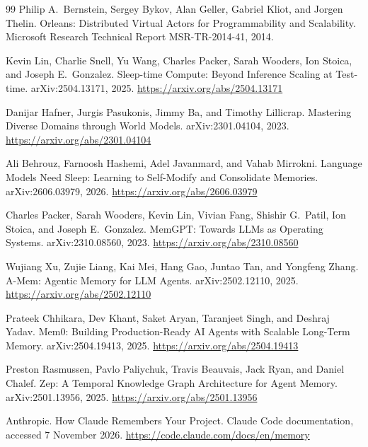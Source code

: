 \documentclass[11pt,a4paper]{article}
\theoremstyle{definition}
\begin{document}
\begin{thebibliography}{99}
Philip A.\ Bernstein, Sergey Bykov, Alan Geller, Gabriel Kliot, and Jorgen Thelin.
\newblock Orleans: Distributed Virtual Actors for Programmability and Scalability.
\newblock Microsoft Research Technical Report MSR-TR-2014-41, 2014.

Kevin Lin, Charlie Snell, Yu Wang, Charles Packer, Sarah Wooders, Ion Stoica, and Joseph E.\ Gonzalez.
\newblock Sleep-time Compute: Beyond Inference Scaling at Test-time.
\newblock arXiv:2504.13171, 2025.
\newblock \url{https://arxiv.org/abs/2504.13171}

Danijar Hafner, Jurgis Pasukonis, Jimmy Ba, and Timothy Lillicrap.
\newblock Mastering Diverse Domains through World Models.
\newblock arXiv:2301.04104, 2023.
\newblock \url{https://arxiv.org/abs/2301.04104}

Ali Behrouz, Farnoosh Hashemi, Adel Javanmard, and Vahab Mirrokni.
\newblock Language Models Need Sleep: Learning to Self-Modify and Consolidate Memories.
\newblock arXiv:2606.03979, 2026.
\newblock \url{https://arxiv.org/abs/2606.03979}

Charles Packer, Sarah Wooders, Kevin Lin, Vivian Fang, Shishir G.\ Patil, Ion Stoica, and Joseph E.\ Gonzalez.
\newblock MemGPT: Towards LLMs as Operating Systems.
\newblock arXiv:2310.08560, 2023.
\newblock \url{https://arxiv.org/abs/2310.08560}

Wujiang Xu, Zujie Liang, Kai Mei, Hang Gao, Juntao Tan, and Yongfeng Zhang.
\newblock A-Mem: Agentic Memory for LLM Agents.
\newblock arXiv:2502.12110, 2025.
\newblock \url{https://arxiv.org/abs/2502.12110}

Prateek Chhikara, Dev Khant, Saket Aryan, Taranjeet Singh, and Deshraj Yadav.
\newblock Mem0: Building Production-Ready AI Agents with Scalable Long-Term Memory.
\newblock arXiv:2504.19413, 2025.
\newblock \url{https://arxiv.org/abs/2504.19413}

Preston Rasmussen, Pavlo Paliychuk, Travis Beauvais, Jack Ryan, and Daniel Chalef.
\newblock Zep: A Temporal Knowledge Graph Architecture for Agent Memory.
\newblock arXiv:2501.13956, 2025.
\newblock \url{https://arxiv.org/abs/2501.13956}

Anthropic.
\newblock How Claude Remembers Your Project.
\newblock Claude Code documentation, accessed 7 November 2026.
\newblock \url{https://code.claude.com/docs/en/memory}


\end{thebibliography}
\end{document}
